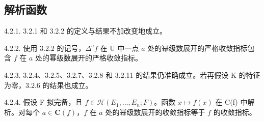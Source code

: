 \subsection{解析函数}

4.2.1. 3.2.1 和 3.2.2 的定义与结果不加改变地成立。

4.2.2. 使用 3.2.2 的记号，\(\Delta^{a}f\) 在 U 中一点 \(a\) 处的幂级数展开的严格收敛指标包含 \(f\) 在 \(a\) 处的幂级数展开的严格收敛指标。

4.2.3. 3.2.4、3.2.5、3.2.7、3.2.8 和 3.2.11 的结果仍准确成立。若再假设 K 的特征为零，3.2.6 的结果也成立。



4.2.4. 假设 F 拟完备，且 \(f\in\mathcal{H}(E_{1},\ldots,E_{n};F)\)。函数 \(x\mapsto f(x)\) 在 C(f) 中解析。对每个 \(a\in\mathbf{C}(f)\)，\(f\) 在 \(a\) 处的幂级数展开的收敛指标等于 \(f\) 的收敛指标。

